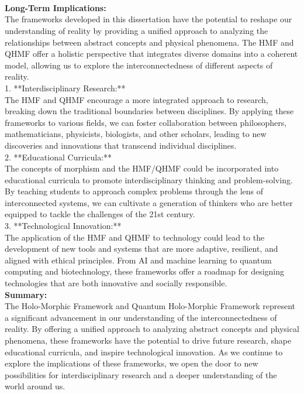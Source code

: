 \documentclass{article}
\begin{document}
\

\

\

\textbf{Long-Term Implications:}
\\

The frameworks developed in this dissertation have the potential to reshape our understanding of reality by providing a unified approach to analyzing the relationships between abstract concepts and physical phenomena. The HMF and QHMF offer a holistic perspective that integrates diverse domains into a coherent model, allowing us to explore the interconnectedness of different aspects of reality.
\\

1. **Interdisciplinary Research:**
\\

   The HMF and QHMF encourage a more integrated approach to research, breaking down the traditional boundaries between disciplines. By applying these frameworks to various fields, we can foster collaboration between philosophers, mathematicians, physicists, biologists, and other scholars, leading to new discoveries and innovations that transcend individual disciplines.
\\

2. **Educational Curricula:**
\\

   The concepts of morphism and the HMF/QHMF could be incorporated into educational curricula to promote interdisciplinary thinking and problem-solving. By teaching students to approach complex problems through the lens of interconnected systems, we can cultivate a generation of thinkers who are better equipped to tackle the challenges of the 21st century.
\\

3. **Technological Innovation:**
\\

   The application of the HMF and QHMF to technology could lead to the development of new tools and systems that are more adaptive, resilient, and aligned with ethical principles. From AI and machine learning to quantum computing and biotechnology, these frameworks offer a roadmap for designing technologies that are both innovative and socially responsible.
\\

\textbf{Summary:}
\\

The Holo-Morphic Framework and Quantum Holo-Morphic Framework represent a significant advancement in our understanding of the interconnectedness of reality. By offering a unified approach to analyzing abstract concepts and physical phenomena, these frameworks have the potential to drive future research, shape educational curricula, and inspire technological innovation. As we continue to explore the implications of these frameworks, we open the door to new possibilities for interdisciplinary research and a deeper understanding of the world around us.
\\
\end{document}
